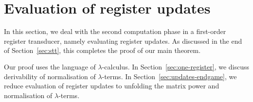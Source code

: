 
\section{Evaluation of register updates}
\label{sec:stt-derivable}
In this section, we deal with the second computation phase in a first-order register transducer, namely evaluating register updates. As  discussed in the end of Section~\ref{sec:stt}, this completes the proof of our main theorem. 



Our proof uses the language of $\lambda$-calculus.  In Section~\ref{sec:one-register},  we discuss derivability of normalisation of $\lambda$-terms. In Section~\ref{sec:updates-endgame}, we reduce evaluation of register updates to  unfolding the matrix power  and normalisation of $\lambda$-terms.  


%



  
